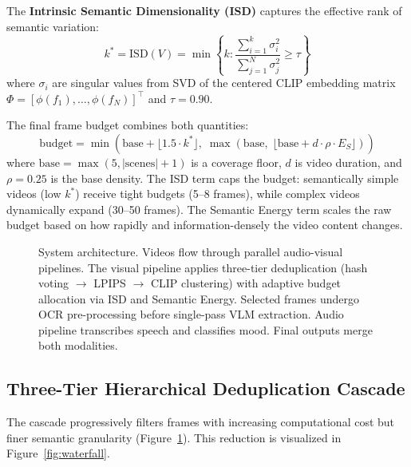 \documentclass[sigconf,nonacm]{acmart}
\begin{document}
The \textbf{Intrinsic Semantic Dimensionality (ISD)} captures the effective rank of semantic variation:
\begin{equation}
\label{eq:isd}
k^* = \text{ISD}(V) = \min\left\{k : \frac{\sum_{i=1}^k \sigma_i^2}{\sum_{j=1}^N \sigma_j^2} \geq \tau\right\}
\end{equation}
where $\sigma_i$ are singular values from SVD of the centered CLIP embedding matrix $\Phi = [\phi(f_1), \ldots, \phi(f_N)]^\top$ and $\tau = 0.90$.

The final frame budget combines both quantities:
\begin{equation}
\label{eq:budget}
\text{budget} = \min\!\left(\text{base} + \lfloor 1.5 \cdot k^* \rfloor,\; \max\!\left(\text{base},\; \lfloor \text{base} + d \cdot \rho \cdot E_S \rfloor\right)\right)
\end{equation}
where $\text{base} = \max(5, |\text{scenes}| + 1)$ is a coverage floor, $d$ is video duration, and $\rho = 0.25$ is the base density. The ISD term caps the budget: semantically simple videos (low $k^*$) receive tight budgets (5--8 frames), while complex videos dynamically expand (30--50 frames). The Semantic Energy term scales the raw budget based on how rapidly and information-densely the video content changes.


\begin{figure}[t]
\centering

\caption{System architecture. Videos flow through parallel audio-visual pipelines. The visual pipeline applies three-tier deduplication (hash voting $\rightarrow$ LPIPS $\rightarrow$ CLIP clustering) with adaptive budget allocation via ISD and Semantic Energy. Selected frames undergo OCR pre-processing before single-pass VLM extraction. Audio pipeline transcribes speech and classifies mood. Final outputs merge both modalities.}
\label{fig:architecture}
\end{figure}

\subsection{Three-Tier Hierarchical Deduplication Cascade}
\label{sec:cascade}

The cascade progressively filters frames with increasing computational cost but finer semantic granularity (Figure~\ref{fig:architecture}). This reduction is visualized in Figure~\ref{fig:waterfall}.
\end{document}
